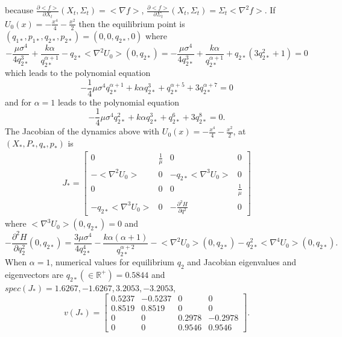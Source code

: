 \documentclass[letterpaper, 12pt]{article}
\begin{document}
because $\frac{\partial \big< f \big>}{\partial X_t}(X_t,\Sigma_t) = \big< \nabla f \big>$, $\frac{\partial \big< f \big>}{\partial \Sigma_t}(X_t,\Sigma_t) = \Sigma_t \big< \nabla^2 f \big>$. If  $U_0(x) = -\frac{x^4}{4} - \frac{x^2}{2}$ then the equilibrium point is $(q_{1*},p_{1*},q_{2*},p_{2*}) = (0,0,q_{2*},0)$ where
\begin{equation}
-\frac{\mu\sigma^4}{4 q_{2*}^3} + \frac{k\alpha}{q_{2*}^{\alpha + 1}} - q_{2*} \big<\nabla^2 U_0 \big>(0,q_{2*}) = -\frac{\mu\sigma^4}{4 q_{2*}^3} + \frac{k\alpha}{q_{2*}^{\alpha + 1}} + q_{2*} (3q_{2*}^2 + 1) = 0
\end{equation}
which leads to the polynomial equation
\begin{equation}
	-\frac{1}{4} \mu \sigma^4 q_{2*}^{\alpha + 1} + k \alpha q_{2*}^{3} + q_{2*}^{\alpha + 5} + 3q_{2*}^{\alpha + 7} = 0
\end{equation}
and for $\alpha = 1$ leads to the polynomial equation
\begin{equation}
	-\frac{1}{4} \mu \sigma^4 q_{2*}^{2} + k \alpha q_{2*}^{3} + q_{2*}^{6} + 3q_{2*}^8 = 0.
\end{equation}
The Jacobian of the dynamics above with $U_0(x) = -\frac{x^4}{4} - \frac{x^2}{2}$, at $(X_*,P_*,q_*,p_*)$ is
\begin{align}
J_* = \begin{bmatrix}
0 & \frac{1}{\mu} & 0 & 0 \\
-\big< \nabla^2 U_0 \big> & 0 & -q_{2*} \big< \nabla^3 U_0 \big> & 0 \\
0 & 0 & 0 & \frac{1}{\mu} \\
-q_{2*} \big< \nabla^3 U_0 \big> & 0 & -\frac{\partial^2 H}{\partial q^2} & 0
\end{bmatrix}
\end{align}
where $\big< \nabla^3 U_0 \big>(0,q_{2*}) = 0$ and
\begin{equation}
-\frac{\partial^2 H}{\partial q_2^2}(0,q_{2*}) = \frac{3 \mu \sigma^4}{4 q_{2*}^4} - \frac{k \alpha (\alpha + 1)}{q_{2*}^{\alpha + 2}} - \big< \nabla^2 U_0 \big>(0,q_{2*}) - q_{2*}^2 \big< \nabla^4 U_0 \big>(0,q_{2*}).
\end{equation}
When $\alpha = 1$, numerical values for equilibrium $q_{2}$ and Jacobian eigenvalues and eigenvectors are $q_{2*}(\in \mathbb{R}^+) = 0.5844$ and
$spec(J_*) = 1.6267, -1.6267, 3.2053, -3.2053$, 
\begin{equation}
	v(J_*) =
	\begin{bmatrix}	
	0.5237 &   -0.5237    &     0    &     0 \\
	0.8519  &  0.8519    &     0    &     0 \\
	0    &     0  &  0.2978  &  -0.2978 \\
	0    &     0  & 0.9546  &  0.9546
	\end{bmatrix}.
\end{equation}
\end{document}

